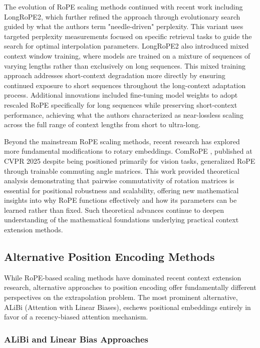 \documentclass[11pt,letterpaper]{article}
\begin{document}
The evolution of RoPE scaling methods continued with recent work including LongRoPE2, which further refined the approach through evolutionary search guided by what the authors term "needle-driven" perplexity. This variant uses targeted perplexity measurements focused on specific retrieval tasks to guide the search for optimal interpolation parameters. LongRoPE2 also introduced mixed context window training, where models are trained on a mixture of sequences of varying lengths rather than exclusively on long sequences. This mixed training approach addresses short-context degradation more directly by ensuring continued exposure to short sequences throughout the long-context adaptation process. Additional innovations included fine-tuning model weights to adopt rescaled RoPE specifically for long sequences while preserving short-context performance, achieving what the authors characterized as near-lossless scaling across the full range of context lengths from short to ultra-long.

Beyond the mainstream RoPE scaling methods, recent research has explored more fundamental modifications to rotary embeddings. ComRoPE \cite{yu2025comrope}, published at CVPR 2025 despite being positioned primarily for vision tasks, generalized RoPE through trainable commuting angle matrices. This work provided theoretical analysis demonstrating that pairwise commutativity of rotation matrices is essential for positional robustness and scalability, offering new mathematical insights into why RoPE functions effectively and how its parameters can be learned rather than fixed. Such theoretical advances continue to deepen understanding of the mathematical foundations underlying practical context extension methods.

\subsection{Alternative Position Encoding Methods}

While RoPE-based scaling methods have dominated recent context extension research, alternative approaches to position encoding offer fundamentally different perspectives on the extrapolation problem. The most prominent alternative, ALiBi (Attention with Linear Biases), eschews positional embeddings entirely in favor of a recency-biased attention mechanism.

\subsubsection{ALiBi and Linear Bias Approaches}
\end{document}
